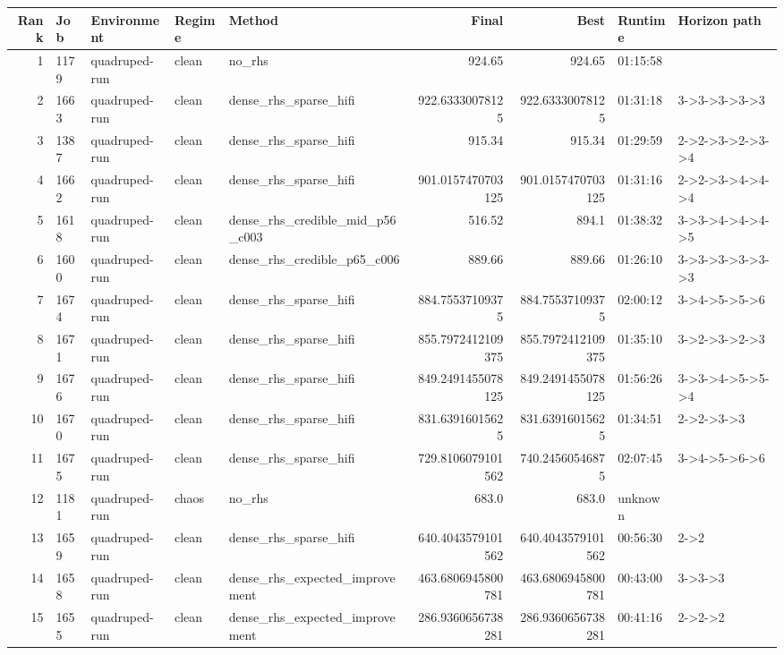 \begin{tabular}{rllllrrll}
\toprule
Rank & Job & Environment & Regime & Method & Final & Best & Runtime & Horizon path \\
\midrule
1 & 1179 & quadruped-run & clean & no\_rhs & 924.65 & 924.65 & 01:15:58 &  \\
2 & 1663 & quadruped-run & clean & dense\_rhs\_sparse\_hifi & 922.63330078125 & 922.63330078125 & 01:31:18 & 3->3->3->3->3 \\
3 & 1387 & quadruped-run & clean & dense\_rhs\_sparse\_hifi & 915.34 & 915.34 & 01:29:59 & 2->2->3->2->3->4 \\
4 & 1662 & quadruped-run & clean & dense\_rhs\_sparse\_hifi & 901.0157470703125 & 901.0157470703125 & 01:31:16 & 2->2->3->4->4->4 \\
5 & 1618 & quadruped-run & clean & dense\_rhs\_credible\_mid\_p56\_c003 & 516.52 & 894.1 & 01:38:32 & 3->3->4->4->4->5 \\
6 & 1600 & quadruped-run & clean & dense\_rhs\_credible\_p65\_c006 & 889.66 & 889.66 & 01:26:10 & 3->3->3->3->3->3 \\
7 & 1674 & quadruped-run & clean & dense\_rhs\_sparse\_hifi & 884.75537109375 & 884.75537109375 & 02:00:12 & 3->4->5->5->6 \\
8 & 1671 & quadruped-run & clean & dense\_rhs\_sparse\_hifi & 855.7972412109375 & 855.7972412109375 & 01:35:10 & 3->2->3->2->3 \\
9 & 1676 & quadruped-run & clean & dense\_rhs\_sparse\_hifi & 849.2491455078125 & 849.2491455078125 & 01:56:26 & 3->3->4->5->5->4 \\
10 & 1670 & quadruped-run & clean & dense\_rhs\_sparse\_hifi & 831.63916015625 & 831.63916015625 & 01:34:51 & 2->2->3->3 \\
11 & 1675 & quadruped-run & clean & dense\_rhs\_sparse\_hifi & 729.8106079101562 & 740.24560546875 & 02:07:45 & 3->4->5->6->6 \\
12 & 1181 & quadruped-run & chaos & no\_rhs & 683.0 & 683.0 & unknown &  \\
13 & 1659 & quadruped-run & clean & dense\_rhs\_sparse\_hifi & 640.4043579101562 & 640.4043579101562 & 00:56:30 & 2->2 \\
14 & 1658 & quadruped-run & clean & dense\_rhs\_expected\_improvement & 463.6806945800781 & 463.6806945800781 & 00:43:00 & 3->3->3 \\
15 & 1655 & quadruped-run & clean & dense\_rhs\_expected\_improvement & 286.9360656738281 & 286.9360656738281 & 00:41:16 & 2->2->2 \\

\end{tabular}
